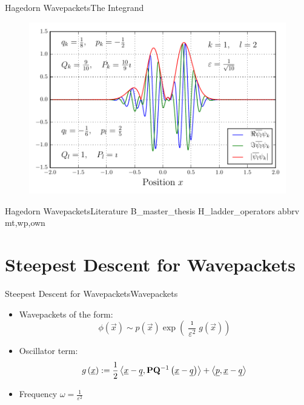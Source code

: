 \documentclass{beamer}
\begin{document}
\begin{frame}{Hagedorn Wavepackets}{The Integrand}
  \begin{figure}
    \centering
    \includegraphics[width=0.8\linewidth]{./fig/overlap_integrand.pdf}
  \end{figure}
\end{frame}


\begin{frame}{Hagedorn Wavepackets}{Literature}
  \nocite{hawp}{B_master_thesis}
  \nocite{hawp}{H_ladder_operators}
  \scriptsize
  {abbrv}
  {mt,wp,own}{}
\end{frame}


\section{Steepest Descent for Wavepackets}


\begin{frame}{Steepest Descent for Wavepackets}{Wavepackets}
  \begin{itemize}
    \item Wavepackets of the form:
    \begin{equation*}
      \phi(\vec{x}) \sim p\left(\vec{x}\right)\exp\left(\frac{\imath}{\varepsilon^2} g\left(\vec{x}\right)\right)
    \end{equation*}
    \item Oscillator term:
    \begin{equation*}
      g\left(\underline{x}\right)
      :=
      \frac{1}{2} \left\langle \underline{x}-\underline{q} , \mathbf{P}\mathbf{Q}{}^{-1} \left(\underline{x}-\underline{q}\right) \right\rangle
      +
      \left\langle \underline{p} , \underline{x}-\underline{q} \right\rangle
    \end{equation*}
    \item Frequency $\omega = \frac{1}{\varepsilon^2}$
  \end{itemize}
\end{frame}
\end{document}
